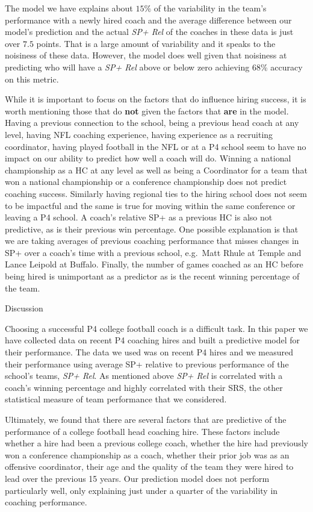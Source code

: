 \documentclass[
  12pt]{article}
\begin{document}
The model we have explains about \(15\%\) of the variability in the
team's performance with a newly hired coach and the average difference
between our model's prediction and the actual \emph{SP+ Rel} of the
coaches in these data is just over \(7.5\) points. That is a large
amount of variability and it speaks to the noisiness of these data.
However, the model does well given that noisiness at predicting who will
have a \emph{SP+ Rel} above or below zero achieving 68\% accuracy on
this metric.

While it is important to focus on the factors that do influence hiring
success, it is worth mentioning those that do \textbf{not} given the
factors that \textbf{are} in the model. Having a previous connection to
the school, being a previous head coach at any level, having NFL
coaching experience, having experience as a recruiting coordinator,
having played football in the NFL or at a P4 school seem to have no
impact on our ability to predict how well a coach will do. Winning a
national championship as a HC at any level as well as being a
Coordinator for a team that won a national championship or a conference
championship does not predict coaching success. Similarly having
regional ties to the hiring school does not seem to be impactful and the
same is true for moving within the same conference or leaving a P4
school. A coach's relative SP+ as a previous HC is also not predictive,
as is their previous win percentage. One possible explanation is that we
are taking averages of previous coaching performance that misses changes
in SP+ over a coach's time with a previous school, e.g.~Matt Rhule at
Temple and Lance Leipold at Buffalo. Finally, the number of games
coached as an HC before being hired is unimportant as a predictor as is
the recent winning percentage of the team.

Discussion

Choosing a successful P4 college football coach is a difficult task. In
this paper we have collected data on recent P4 coaching hires and built
a predictive model for their performance. The data we used was on recent
P4 hires and we measured their performance using average SP+ relative to
previous performance of the school's teams, \emph{SP+ Rel}. As mentioned
above \emph{SP+ Rel} is correlated with a coach's winning percentage and
highly correlated with their SRS, the other statistical measure of team
performance that we considered.

Ultimately, we found that there are several factors that are predictive
of the performance of a college football head coaching hire. These
factors include whether a hire had been a previous college coach,
whether the hire had previously won a conference championship as a
coach, whether their prior job was as an offensive coordinator, their
age and the quality of the team they were hired to lead over the
previous 15 years. Our prediction model does not perform particularly
well, only explaining just under a quarter of the variability in
coaching performance.
\end{document}
